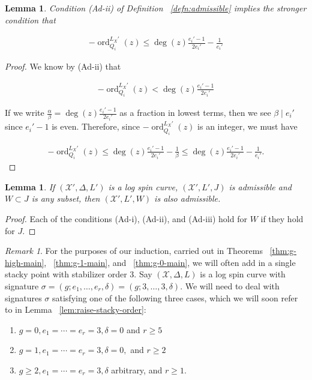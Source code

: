 \documentclass{amsart}
\theoremstyle{plain}
\newtheorem{lem}[thm]{Lemma}
\theoremstyle{definition}
\theoremstyle{remark}
\newtheorem{rem}[thm]{Remark}
\numberwithin{equation}{section}
\newcommand \sx{\mathscr X}
\DeclareMathOperator{\ord}{ord}
\newcommand \subhalf[1]{\frac{{#1} - 1}{2{#1}}}
\newcommand \halfcan{L}
\begin{document}
\begin{lem}
\label{lem:admissible_inequality}
Condition (Ad-ii) of Definition ~\ref{defn:admissible} implies the
stronger condition that

\begin{align*}
	-\ord_{Q_i}
^{\halfcan_X'}(z) \leq \deg(z) \subhalf{e_i'} -\frac{1}{e_i'}
\end{align*}
\end{lem}

\begin{proof}
We know by (Ad-ii) that

\begin{align*}
	-\ord_{Q_i}
^{\halfcan_X'}(z) < \deg(z) \subhalf{e_i'}
\end{align*}

\noindent
If we write $\frac{\alpha}{\beta} = \deg(z) \frac{e_i'- 1}{2e_i'}$ 
as a fraction in lowest terms, then we see $\beta \mid e_i'$ since $
e_i'- 1$ is even. Therefore, since $-\ord_{Q_i}
^{\halfcan_X'}(z)$ is an integer, 
we must have

\begin{align*}
	-\ord_{Q_i}
^{\halfcan_X'}(z) \leq \deg(z) \subhalf{e_i'} - \frac{1}{\beta} \leq 
	\deg(z) \subhalf{e_i'} - \frac{1}{e_i'}.
\end{align*}
\end{proof}

\begin{lem}
\label{lem:admissible_subset}
If $(\sx',\Delta,L')$ is a log spin curve, $(\sx',L', J)$ is admissible and $W \subset J$ is any subset,
then $(\sx', L', W)$ is also admissible.
\end{lem}

\begin{proof}
Each of the conditions (Ad-i), (Ad-ii), and (Ad-iii) hold for $W$
if they hold for $J$.
\end{proof}

\begin{rem}
\label{rem:three-cases}
For the purposes of our induction, carried out in Theorems ~\ref{thm:g-high-main}, ~\ref{thm:g-1-main}, and ~\ref{thm:g-0-main}, we will often add in a single
stacky point with stabilizer order $3$. Say $(\sx,\Delta,\halfcan)$ is a log spin
curve with signature $\sigma = (g;e_1,\ldots, e_r,\delta) = (g;3,\ldots, 3,
\delta)$. We will need to deal with signatures $\sigma$ satisfying one of the following three cases, which we will soon refer to in Lemma ~\ref{lem:raise-stacky-order}:
\begin{enumerate}
	\item $g = 0, e_1 = \cdots = e_r = 3, \delta = 0$ and $r \geq 5$
	\item $g = 1, e_1 = \cdots = e_r = 3, \delta = 0,$ and $ r \geq 2$
	\item $g \geq 2, e_1 = \cdots = e_r = 3, \delta$ arbitrary, and $r \geq 1$.
\end{enumerate}
\end{rem}
\end{document}
